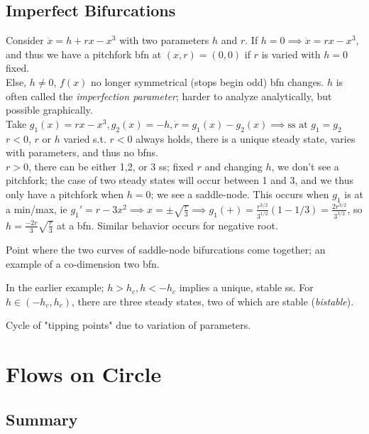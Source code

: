 \documentclass[12pt, oneside]{article}
\begin{document}
\subsection{Imperfect Bifurcations}

\begin{example}
  Consider $\dot{x} = h + rx - x^3$ with two parameters $h$ and $r$. If $h=0 \implies \dot{x} = rx-x^3$, and thus we have a pitchfork bfn at $(x,r) = (0,0)$ if $r$ is varied with $h=0$ fixed.\\
  Else, $h \neq 0$, $f(x)$ no longer symmetrical (stops begin odd) bfn changes. $h$ is often called the \emph{imperfection parameter}; harder to analyze analytically, but possible graphically.\\
  Take $g_1(x) = rx - x^3, g_2(x) = -h, \dot{r} = g_1(x) - g_2(x) \implies \text{ss at } g_1 = g_2$\\
  $r<0$, $r$ or $h$ varied s.t. $r<0$ always holds, there is a unique steady state, varies with parameters, and thus no bfns.\\
  $r>0$, there can be either 1,2, or 3 ss; fixed $r$ and changing $h$, we don't see a pitchfork; the case of two steady states will occur between 1 and 3, and we thus only have a pitchfork when $h=0$; we see a saddle-node. This occurs when $g_1$ is at a min/max, ie $g_1' = r - 3x^2 \implies x = \pm \sqrt{\frac{r}{3}} \implies g_1(+) = \frac{r^{3/2}}{3^{1/2}}(1 - 1/3) = \frac{2r^{3/2}}{3^{3/2}}$, so $h = \frac{-2r}{3}\sqrt{\frac{r}{3}}$ at a bfn. Similar behavior occurs for negative root.
\end{example}

\begin{definition}
  Point where the two curves of saddle-node bifurcations come together; an example of a co-dimension two bfn.
\end{definition}

In the earlier example; $h>h_c, h < -h_c$ implies a unique, stable ss. For $h \in (-h_c, h_c)$, there are three steady states, two of which are stable (\emph{bistable}).


\begin{definition}[Hysteresis]
  Cycle of "tipping points" due to variation of parameters.
\end{definition}

\section{Flows on Circle}
\subsection{Summary}
\end{document}
